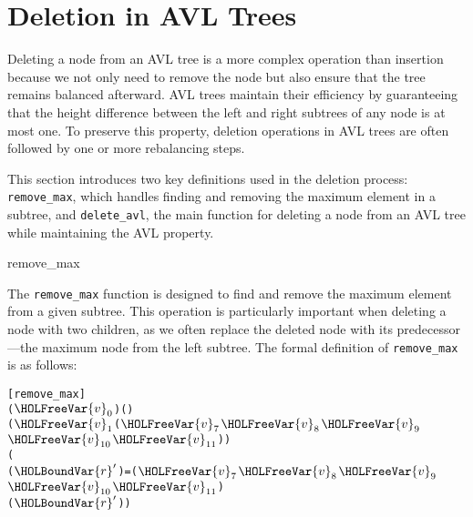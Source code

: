 \chapter{Deletion in AVL Trees}\label{chap:LaTeXAdvice}

Deleting a node from an AVL tree is a more complex operation than insertion because we not only need to remove the node but also ensure that the tree remains balanced afterward. AVL trees maintain their efficiency by guaranteeing that the height difference between the left and right subtrees of any node is at most one. To preserve this property, deletion operations in AVL trees are often followed by one or more rebalancing steps.

This section introduces two key definitions used in the deletion process: \texttt{remove\_max}, which handles finding and removing the maximum element in a subtree, and \texttt{delete\_avl}, the main function for deleting a node from an AVL tree while maintaining the AVL property.

\begin{defn}{remove\_max}

The \texttt{remove\_max} function is designed to find and remove the maximum element from a given subtree. This operation is particularly important when deleting a node with two children, as we often replace the deleted node with its predecessor—the maximum node from the left subtree. The formal definition of \texttt{remove\_max} is as follows:


\begin{alltt}
	[remove_max]
	 ( \ensuremath{\HOLFreeVar{v}\sb{\mathrm{0}}}    ) \HOLTokenDefEquality{} (\HOLSymConst{,}\HOLSymConst{,})
 ( \ensuremath{\HOLFreeVar{v}\sb{\mathrm{1}}}    ( \ensuremath{\HOLFreeVar{v}\sb{\mathrm{7}}} \ensuremath{\HOLFreeVar{v}\sb{\mathrm{8}}} \ensuremath{\HOLFreeVar{v}\sb{\mathrm{9}}} \ensuremath{\HOLFreeVar{v}\sb{\mathrm{10}}} \ensuremath{\HOLFreeVar{v}\sb{\mathrm{11}}})) \HOLTokenDefEquality{}
  (
     (\HOLSymConst{,}\HOLSymConst{,}\ensuremath{\HOLBoundVar{r}\sp{\prime{}}}) =  ( \ensuremath{\HOLFreeVar{v}\sb{\mathrm{7}}} \ensuremath{\HOLFreeVar{v}\sb{\mathrm{8}}} \ensuremath{\HOLFreeVar{v}\sb{\mathrm{9}}} \ensuremath{\HOLFreeVar{v}\sb{\mathrm{10}}} \ensuremath{\HOLFreeVar{v}\sb{\mathrm{11}}})
     (\HOLSymConst{,}\HOLSymConst{,}    \ensuremath{\HOLBoundVar{r}\sp{\prime{}}}))
\end{alltt}

\end{defn}


